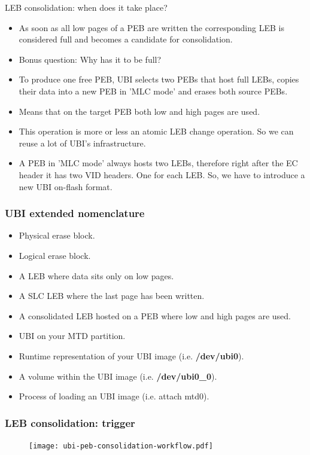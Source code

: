 \documentclass[aspectratio=169,obeyspaces,spaces,hyphens,dvipsnames]{beamer}
\begin{document}
\begin{frame}{LEB consolidation: when does it take place?}
  \begin{itemize}
  \item As soon as all low pages of a PEB are written the corresponding LEB is
	considered full and becomes a candidate for consolidation.
  \item Bonus question: Why has it to be full?
  \item To produce one free PEB, UBI selects two PEBs that host full LEBs,
	copies their data into a new PEB in 'MLC mode' and erases both source
	PEBs.
  \item Means that on the target PEB both low and high pages are used.
  \item This operation is more or less an atomic LEB change operation. So we
	can reuse a lot of  UBI's infrastructure.
  \item A PEB in 'MLC mode' always hosts two LEBs, therefore right after the
	EC header it has two VID headers. One for each LEB. So, we have to
	introduce a new UBI on-flash format.
  \end{itemize}
\end{frame}

\begin{frame}[fragile]
\frametitle{UBI extended nomenclature}
  \begin{itemize}
  \item[PEB] Physical erase block.
  \item[LEB] Logical erase block.
  \item[SLC LEB] A LEB where data sits only on low pages.
  \item[Full LEB] A SLC LEB where the last page has been written.
  \item[CLEB] A consolidated LEB hosted on a PEB where low and high pages are used.
  \item[Image] UBI on your MTD partition.
  \item[Device] Runtime representation of your UBI image (i.e. \textbf{/dev/ubi0}).
  \item[Volume] A volume within the UBI image (i.e. \textbf{/dev/ubi0\_0}).
  \item[Attach] Process of loading an UBI image (i.e. attach mtd0).
  \end{itemize}
\end{frame}

\begin{frame}[fragile]
\frametitle{LEB consolidation: trigger}
     \begin{figure}
     \texttt{[image: ubi-peb-consolidation-workflow.pdf]}
     \end{figure}
\end{frame}
\end{document}
